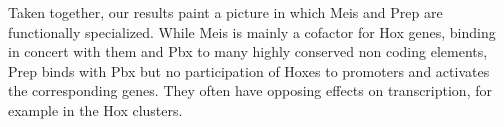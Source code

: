 Taken together, our results paint a picture in which Meis and Prep are functionally specialized. While Meis is mainly a cofactor for Hox genes, binding in concert with them and Pbx to many highly conserved non coding elements, Prep binds with Pbx but no participation of Hoxes to promoters and activates the corresponding genes. They often have opposing effects on transcription, for example in the Hox clusters. 


